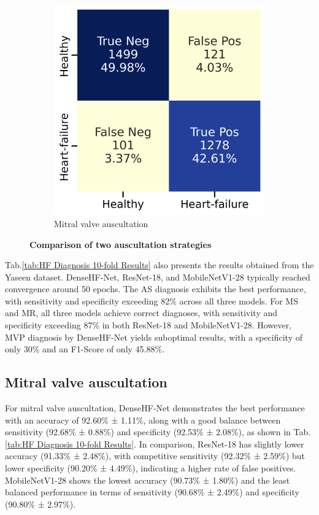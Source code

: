 \begin{figure}[htbp]
\begin{subfigure}[b]{0.4\textwidth}
        \includegraphics[width=\textwidth]{./figs/results/Confusion Matrix 1.png}
        \caption{Mitral valve auscultation}
        \label{fig:mitral_valve_1}
    \end{subfigure}
    \caption{\textbf{Comparison of two auscultation strategies}}
    \label{fig:comparison}
\end{figure}

Tab.\ref{tab:HF Diagnosis 10-fold Results} also presents the results obtained from the Yaseen dataset. DenseHF-Net, ResNet-18, and MobileNetV1-28 typically reached convergence around 50 epochs. The AS diagnosis exhibits the best performance, with sensitivity and specificity exceeding 82\% across all three models. For MS and MR, all three models achieve correct diagnoses, with sensitivity and specificity exceeding 87\% in both ResNet-18 and MobileNetV1-28. However, MVP diagnosis by DenseHF-Net yields suboptimal results, with a specificity of only 30\% and an F1-Score of only 45.88\%.




\subsection{Mitral valve auscultation}
For mitral valve auscultation, DenseHF-Net demonstrates the best performance with an accuracy of 92.60\% ± 1.11\%, along with a good balance between sensitivity (92.68\% ± 0.88\%) and specificity (92.53\% ± 2.08\%), as shown in Tab.\ref{tab:HF Diagnosis 10-fold Results}. In comparison, ResNet-18 has slightly lower accuracy (91.33\% ± 2.48\%), with competitive sensitivity (92.32\% ± 2.59\%) but lower specificity (90.20\% ± 4.49\%), indicating a higher rate of false positives. MobileNetV1-28 shows the lowest accuracy (90.73\% ± 1.80\%) and the least balanced performance in terms of sensitivity (90.68\% ± 2.49\%) and specificity (90.80\% ± 2.97\%).

